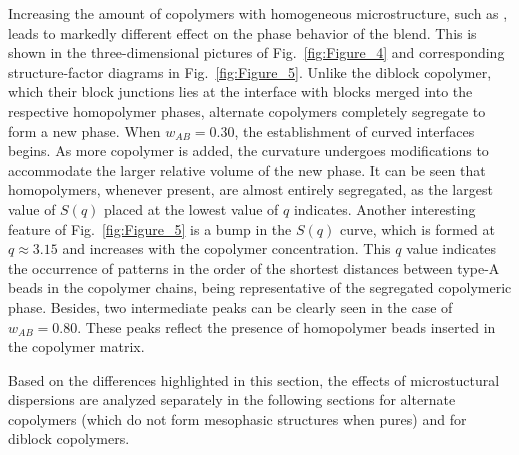 \documentclass[
aip,
jcp,
reprint,
]{revtex4-1}
\begin{document}
Increasing the amount of copolymers with homogeneous microstructure, such as , leads to markedly different effect on the phase behavior of the blend.
This is shown in the three-dimensional pictures of Fig.~\ref{fig:Figure_4} and corresponding structure-factor diagrams in Fig.~\ref{fig:Figure_5}.
Unlike the diblock copolymer, which their block junctions lies at the interface with blocks merged into the respective homopolymer phases, alternate copolymers completely segregate to form a new phase.
When $w_{AB}=0.30$, the establishment of curved interfaces begins.
As more copolymer is added, the curvature undergoes modifications to accommodate the larger relative volume of the new phase.
It can be seen that homopolymers, whenever present, are almost entirely segregated, as the largest value of $S(q)$ placed at the lowest value of $q$ indicates.
Another interesting feature of Fig.~\ref{fig:Figure_5} is a bump in the $S(q)$ curve, which is formed at $q \approx 3.15$ and increases with the copolymer concentration.
This $q$ value indicates the occurrence of patterns in the order of the shortest distances between type-A beads in the copolymer chains, being representative of the segregated copolymeric phase.
Besides, two intermediate peaks can be clearly seen in the case of $w_{AB}=0.80$.
These peaks reflect the presence of homopolymer beads inserted in the copolymer matrix.

Based on the differences highlighted in this section, the effects of microstuctural dispersions are analyzed separately in the following sections for alternate copolymers (which do not form mesophasic structures when pures) and for diblock copolymers.
\end{document}

